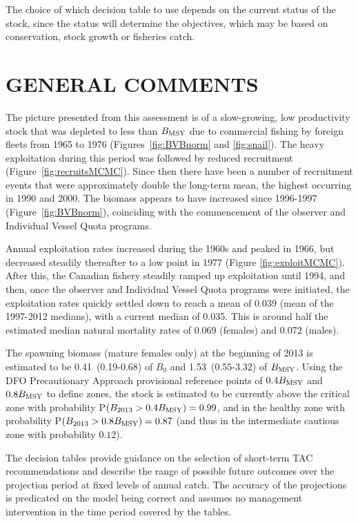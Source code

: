 The choice of which decision table to use depends on the current status of the stock, since the status will determine the objectives, which may be based on conservation, stock growth or fisheries catch. 

\vspace{10mm}     %
\section{GENERAL COMMENTS}

The picture presented from this assessment is of a slow-growing, low productivity stock that was depleted to less than $B_\mathrm{MSY}$ due to commercial fishing by foreign fleets from 1965 to 1976 (Figures~\ref{fig:BVBnorm} and \ref{fig:snail}). The heavy exploitation during this period was followed by reduced recruitment (Figure~\ref{fig:recruitsMCMC}). Since then there have been a number of recruitment events that were approximately double the long-term mean, the highest occurring in 1990 and 2000. The biomass appears to have increased since 1996-1997 (Figure~\ref{fig:BVBnorm}), coinciding with the commencement of the observer and Individual Vessel Quota programs.

Annual exploitation rates increased during the 1960s and peaked in 1966, but decreased steadily thereafter to a low point in 1977 (Figure \ref{fig:exploitMCMC}). After this, the Canadian fishery steadily ramped up exploitation until 1994, and then, once the observer and Individual Vessel Quota programs were initiated, the exploitation rates quickly settled down to reach a mean of 0.039 (mean of the 1997-2012 medians), with a current median of 0.035. This is around half the estimated median natural mortality rates of 0.069 (females) and 0.072 (males).

The spawning biomass (mature females only) at the beginning of 2013 is estimated to be 0.41~(0.19-0.68) of $B_0$ and 1.53~(0.55-3.32) of $B_\mathrm{MSY}$. Using the DFO Precautionary Approach provisional reference points of $0.4 B_\mathrm{MSY}$ and $0.8 B_\mathrm{MSY}$ to define zones, the stock is estimated to be currently above the critical zone with probability P$(B_{2013} > 0.4 B_\mathrm{MSY}) = 0.99$, and in the healthy zone with probability P$(B_{2013} > 0.8 B_\mathrm{MSY}) = 0.87$ (and thus in the intermediate cautious zone with probability $0.12$).


The decision tables provide guidance on the selection of short-term TAC recommendations and describe the range of possible future outcomes over the projection period at fixed levels of annual catch. The accuracy of the projections is predicated on the model being correct and assumes no management intervention in the time period covered by the tables.

